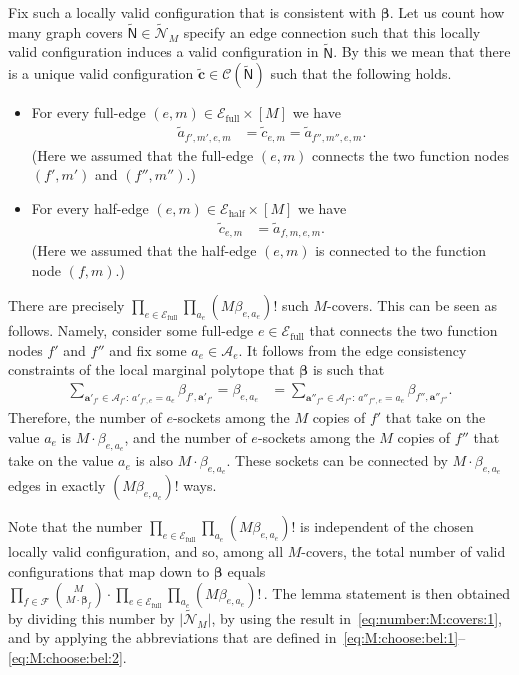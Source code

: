 \documentclass[journal, twocolumn]{IEEEtran}
\renewcommand{\mathbf}[1]{{\bm{#1}}}
\newcommand{\vect}[1]{\mathbf{#1}}
\newcommand{\code}[1]{\mathcal{#1}}
\newcommand{\set}[1]{\mathcal{#1}}
\newcommand{\graph}[1]{\mathsf{#1}}
\newcommand{\codeCedge}{\code{C}}
\newcommand{\bel}{\beta}
\newcommand{\vbel}{\boldsymbol{\bel}}
\newcommand{\setA}{\set{A}}
\newcommand{\setEfull}{\set{E}_{\mathrm{full}}}
\newcommand{\setEhalf}{\set{E}_{\mathrm{half}}}
\newcommand{\setF}{\set{F}}
\newcommand{\va}{\vect{a}}
\newcommand{\cvc}{\vect{\cover{c}}}
\newcommand{\cover}[1]{\tilde{#1}}
\newcommand{\cset}[1]{\cover{\set{#1}}}
\newcommand{\cgraph}[1]{\cover{\graph{#1}}}
\newcommand{\cardbig}[1]{\big\lvert #1 \big\rvert}
\newcommand{\?}{\mathrm{?}}
\begin{document}
Fix such a locally valid configuration that is consistent with $\vbel$. Let us
count how many graph covers $\cgraph{N} \in \cset{N}_M$ specify an edge
connection such that this locally valid configuration induces a valid
configuration in $\cgraph{N}$. By this we mean that there is a unique valid
configuration $\cvc \in \codeCedge(\cgraph{N})$ such that the following holds.
\begin{itemize}

\item For every full-edge $(e,m) \in \setEfull \times [M]$ we have
  \begin{align*}
    \cover{a}_{f',m',e,m}
      &= \cover{c}_{e,m}
       = \cover{a}_{f'',m'',e,m}.
  \end{align*}
  (Here we assumed that the full-edge $(e,m)$ connects the two function nodes
  $(f',m')$ and $(f'',m'')$.)
  
\item For every half-edge $(e,m) \in \setEhalf \times [M]$ we have
  \begin{align*}
    \cover{c}_{e,m}
      &= \cover{a}_{f,m,e,m}.
  \end{align*}
  (Here we assumed that the half-edge $(e,m)$ is connected to the function node
  $(f,m)$.)
\end{itemize}
There are precisely $\prod_{e \in \setEfull} \prod_{a_e} (M \bel_{e,a_e})!$
such $M$-covers. This can be seen as follows. Namely, consider some full-edge
$e \in \setEfull$ that connects the two function nodes $f'$ and $f''$ and fix
some $a_e \in \setA_e$. It follows from the edge consistency constraints of
the local marginal polytope that $\vbel$ is such that
\begin{align*}
  \sum_{\va'_{f'} \in \setA_{f'}: \, a'_{f',e} = a_e} \!\!\!
    \bel_{f', \va'_{f'}} = \bel_{e,a_e}
    &= \sum_{\va''_{f''} \in \setA_{f''}: \, a''_{f'',e} = a_e} \!\!\!
         \bel_{f'', \va''_{f''}}.
\end{align*}
Therefore, the number of $e$-sockets among the $M$ copies of $f'$ that take on
the value $a_e$ is $M \cdot \bel_{e,a_e}$, and the number of $e$-sockets among
the $M$ copies of $f''$ that take on the value $a_e$ is also $M \cdot
\bel_{e,a_e}$.  These sockets can be connected by $M \cdot \bel_{e,a_e}$ edges
in exactly $(M \bel_{e,a_e})!$ ways.

Note that the number $\prod_{e \in \setEfull} \prod_{a_e} (M \bel_{e,a_e})!$
is independent of the chosen locally valid configuration, and so, among all
$M$-covers, the total number of valid configurations that map down to $\vbel$
equals $\prod_{f \in \setF} {M \choose M \cdot \vbel_f} \cdot \prod_{e \in
  \setEfull} \prod_{a_e} (M \bel_{e,a_e})!$\,. The lemma statement is then
obtained by dividing this number by $\cardbig{\cset{N}_M}$, by using the
result in~\eqref{eq:number:M:covers:1}, and by applying the abbreviations that
are defined in~\eqref{eq:M:choose:bel:1}--\eqref{eq:M:choose:bel:2}.
\end{document}
